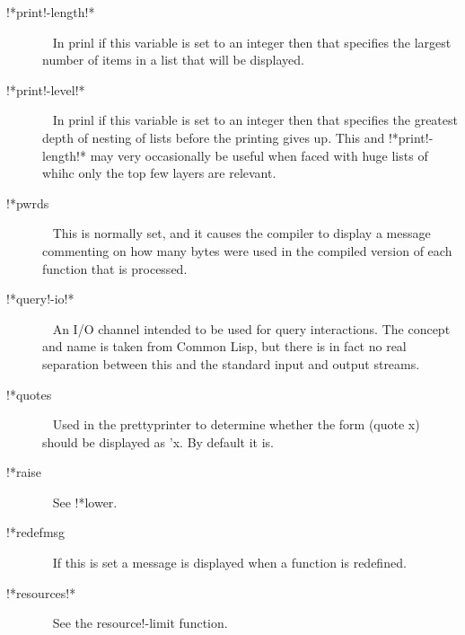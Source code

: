 \documentclass[a4paper,11pt]{article}
\begin{document}
\begin{description}
\item [{\ttfamily !*print!-length!*}]  ~\newline
In {\ttfamily prinl} if this variable is set to an integer then that specifies
the largest number of items in a list that will be displayed.

\item [{\ttfamily !*print!-level!*}]  ~\newline
In {\ttfamily prinl} if this variable is set to an integer then that specifies
the greatest depth of nesting of lists before the printing gives up. This
and {\ttfamily !*print!-length!*} may very occasionally be useful when
faced with huge lists of whihc only the top few layers are relevant.

\item [{\ttfamily !*pwrds}]  ~\newline
This is normally set, and it causes the compiler to display a message
commenting on how many bytes were used in the compiled version of each
function that is processed.

\item [{\ttfamily !*query!-io!*}]  ~\newline
An I/O channel intended to be used for query interactions. The concept
and name is taken from Common Lisp, but there is in fact no real separation
between this and the standard input and output streams.

\item [{\ttfamily !*quotes}]  ~\newline
Used in the prettyprinter to determine whether the form {\ttfamily (quote x)}
should be displayed as {\ttfamily 'x}. By default it is.

\item [{\ttfamily !*raise}]  ~\newline
See {\ttfamily !*lower}.

\item [{\ttfamily !*redefmsg}]  ~\newline
If this is set a message is displayed when a function is redefined.

\item [{\ttfamily !*resources!*}]  ~\newline
See the {\ttfamily resource!-limit} function.


\end{description}
\end{document}
